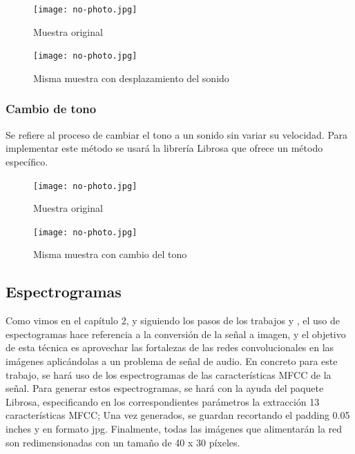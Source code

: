 \documentclass[11pt,a4paper,spanish]{book}
\begin{document}
		\begin{figure}[!htb]
			\begin{minipage}{0.45\textwidth}
				\centering
				\texttt{[image: no-photo.jpg]}
				\caption{Muestra original}
				\label{ref:audio_original_2}
			\end{minipage}\hfill 
			\begin{minipage}{0.45\textwidth}
				\centering
				\texttt{[image: no-photo.jpg]}\hfill
				\caption{Misma muestra con desplazamiento del sonido}
				\label{ref:audio_shiftting}
			\end{minipage}
		\end{figure}
		
		\subsubsection{Cambio de tono}
		Se refiere al proceso de cambiar el tono a un sonido sin variar su velocidad. Para implementar este método se usará la librería Librosa que ofrece un método específico.
		
		\begin{figure}[!htb]
			\begin{minipage}{0.45\textwidth}
				\centering
				\texttt{[image: no-photo.jpg]}
				\caption{Muestra original}
				\label{ref:audio_original_3}
			\end{minipage}\hfill 
			\begin{minipage}{0.45\textwidth}
				\centering
				\texttt{[image: no-photo.jpg]}\hfill
				\caption{Misma muestra con cambio del tono}
				\label{ref:audio_tunning}
			\end{minipage}
		\end{figure}
	
	
	\subsection{Espectrogramas}
	Como vimos en el capítulo 2, y siguiendo los pasos de los trabajos \cite{Anvarjon2020} y \cite{Mustaqeem2020}, el uso de espectogramas hace referencia a la conversión de la señal a imagen, y el objetivo de esta técnica es aprovechar las fortalezas de las redes convolucionales en las imágenes aplicándolas a un problema de señal de audio. En concreto para este trabajo, se hará uso de los espectrogramas de las características MFCC de la señal. Para generar estos espectrogramas, se hará con la ayuda del paquete Librosa, especificando en los correspondientes parámetros la extracción 13 características MFCC; Una vez generados, se guardan recortando el padding 0.05 inches y en formato jpg.
	Finalmente, todas las imágenes que alimentarán la red son redimensionadas con un tamaño de 40 x 30 píxeles.
	
\end{document}
